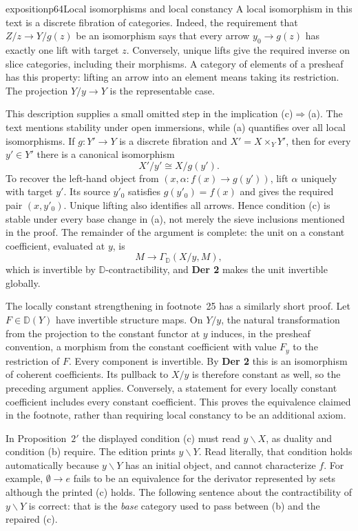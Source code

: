 \begin{dcomment}{exposition}{p64}{Local isomorphisms and local constancy}
A local isomorphism in this text is a discrete fibration of categories. Indeed, the requirement that $Z/z\to Y/g(z)$ be an isomorphism says that every arrow $y_0\to g(z)$ has exactly one lift with target $z$. Conversely, unique lifts give the required inverse on slice categories, including their morphisms. A category of elements of a presheaf has this property: lifting an arrow into an element means taking its restriction. The projection $Y/y\to Y$ is the representable case.

This description supplies a small omitted step in the implication (c)$\Rightarrow$(a). The text mentions stability under open immersions, while (a) quantifies over all local isomorphisms. If $g:Y'\to Y$ is a discrete fibration and $X'=X\times_Y Y'$, then for every $y'\in Y'$ there is a canonical isomorphism
\[
 X'/y'\cong X/g(y').
\]
To recover the left-hand object from $(x,\alpha:f(x)\to g(y'))$, lift $\alpha$ uniquely with target $y'$. Its source $y'_0$ satisfies $g(y'_0)=f(x)$ and gives the required pair $(x,y'_0)$. Unique lifting also identifies all arrows. Hence condition (c) is stable under every base change in (a), not merely the sieve inclusions mentioned in the proof. The remainder of the argument is complete: the unit on a constant coefficient, evaluated at $y$, is
\[
 M\longrightarrow\Gamma_{\mathbb D}(X/y,M),
\]
which is invertible by $\mathbb D$-contractibility, and \textbf{Der 2} makes the unit invertible globally.

The locally constant strengthening in footnote~25 has a similarly short proof. Let $F\in\mathbb D(Y)$ have invertible structure maps. On $Y/y$, the natural transformation from the projection to the constant functor at $y$ induces, in the presheaf convention, a morphism from the constant coefficient with value $F_y$ to the restriction of $F$. Every component is invertible. By \textbf{Der 2} this is an isomorphism of coherent coefficients. Its pullback to $X/y$ is therefore constant as well, so the preceding argument applies. Conversely, a statement for every locally constant coefficient includes every constant coefficient. This proves the equivalence claimed in the footnote, rather than requiring local constancy to be an additional axiom.

In Proposition~$2'$ the displayed condition (c) must read $y\backslash X$, as duality and condition (b) require. The edition prints $y\backslash Y$. Read literally, that condition holds automatically because $y\backslash Y$ has an initial object, and cannot characterize $f$. For example, $\emptyset\to e$ fails to be an equivalence for the derivator represented by sets although the printed (c) holds. The following sentence about the contractibility of $y\backslash Y$ is correct: that is the \emph{base} category used to pass between (b) and the repaired (c).


\end{dcomment}

